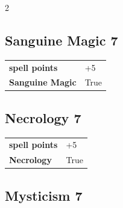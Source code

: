 \begin{multicols}{2}
\begin{tcolorbox}

\end{tcolorbox}

\begin{tcolorbox}
    \subsection*{Sanguine Magic \hfill \small{7 }}
    \tcblower




\begin{tabular}{@{}ll@{}}
    \textbf{spell points} & +5\\
    \textbf{Sanguine Magic} & True\\
\end{tabular}


\end{tcolorbox}

\begin{tcolorbox}
    \subsection*{Necrology \hfill \small{7 }}
    \tcblower




\begin{tabular}{@{}ll@{}}
    \textbf{spell points} & +5\\
    \textbf{Necrology} & True\\
\end{tabular}


\end{tcolorbox}

\begin{tcolorbox}
    \subsection*{Mysticism \hfill \small{7 }}
    \tcblower





\end{tcolorbox}
\end{multicols}

